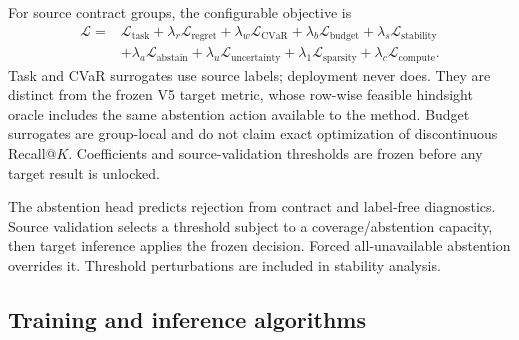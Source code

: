 For source contract groups, the configurable objective is
\[
\begin{aligned}
\mathcal L={}&\mathcal L_{\mathrm{task}}+
\lambda_r\mathcal L_{\mathrm{regret}}+
\lambda_w\mathcal L_{\mathrm{CVaR}}+
\lambda_b\mathcal L_{\mathrm{budget}}+
\lambda_s\mathcal L_{\mathrm{stability}}\\
&+\lambda_a\mathcal L_{\mathrm{abstain}}+
\lambda_u\mathcal L_{\mathrm{uncertainty}}+
\lambda_1\mathcal L_{\mathrm{sparsity}}+\lambda_c\mathcal L_{\mathrm{compute}}.
\end{aligned}
\]
Task and CVaR surrogates use source labels; deployment never does. They are distinct from the frozen V5 target metric, whose row-wise feasible hindsight oracle includes the same abstention action available to the method. Budget surrogates are group-local and do not claim exact optimization of discontinuous Recall@\(K\). Coefficients and source-validation thresholds are frozen before any target result is unlocked.

The abstention head predicts rejection from contract and label-free diagnostics. Source validation selects a threshold subject to a coverage/abstention capacity, then target inference applies the frozen decision. Forced all-unavailable abstention overrides it. Threshold perturbations are included in stability analysis.

\subsection{Training and inference algorithms}

\noindent{}

